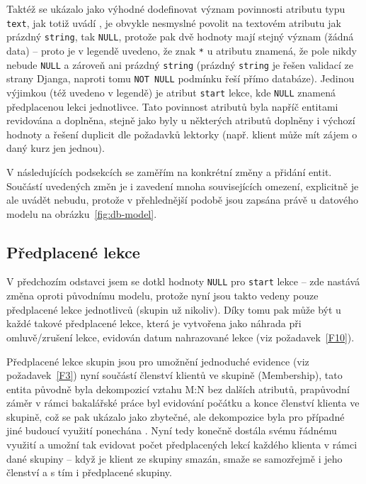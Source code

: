 Taktéž se ukázalo jako výhodné dodefinovat význam povinnosti atributu typu \verb|text|, jak totiž uvádí \cite{django-docs-model}, je obvykle nesmyslné povolit na textovém atributu jak prázdný \verb|string|, tak \verb|NULL|, protože pak dvě hodnoty mají stejný význam (žádná data) -- proto je v legendě uvedeno, že znak \verb|*| u atributu znamená, že pole nikdy nebude \verb|NULL| a zároveň ani prázdný \verb|string| (prázdný \verb|string| je řešen validací ze strany Djanga, naproti tomu \verb|NOT NULL| podmínku řeší přímo databáze). Jedinou výjimkou (též uvedeno v legendě) je atribut \verb|start| lekce, kde \verb|NULL| znamená předplacenou lekci jednotlivce. Tato povinnost atributů byla napříč entitami revidována a doplněna, stejně jako byly u některých atributů doplněny i výchozí hodnoty a řešení duplicit dle požadavků lektorky (např. klient může mít zájem o daný kurz jen jednou).

V následujících podsekcích se zaměřím na konkrétní změny a přidání entit. Součástí uvedených změn je i zavedení mnoha souvisejících omezení, explicitně je ale uvádět nebudu, protože v přehlednější podobě jsou zapsána právě u datového modelu na obrázku~\ref{fig:db-model}.

\subsection{Předplacené lekce}

V předchozím odstavci jsem se dotkl hodnoty \verb|NULL| pro \verb|start| lekce -- zde nastává změna oproti původnímu modelu, protože nyní jsou takto vedeny pouze předplacené lekce jednotlivců (skupin už nikoliv). Díky tomu pak může být u každé takové předplacené lekce, která je vytvořena jako náhrada při omluvě/zrušení lekce, evidován datum nahrazované lekce (viz požadavek~\ref{F10}).

Předplacené lekce skupin jsou pro umožnění jednoduché evidence (viz požadavek~\ref{F3}) nyní součástí členství klientů ve skupině (Membership), tato entita původně byla dekompozicí vztahu M:N bez dalších atributů, prapůvodní záměr v rámci bakalářské práce byl evidování počátku a konce členství klienta ve skupině, což se pak ukázalo jako zbytečné, ale dekompozice byla pro případné jiné budoucí využití ponechána \cite{bp}. Nyní tedy konečně dostála svému řádnému využití a umožní tak evidovat počet předplacených lekcí každého klienta v rámci dané skupiny -- když je klient ze skupiny smazán, smaže se samozřejmě i jeho členství a s tím i předplacené skupiny.

